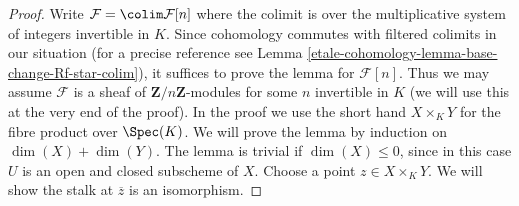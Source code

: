 \begin{proof}
Write $\mathcal{F} = \colim \mathcal{F}[n]$ where the colimit
is over the multiplicative system of integers invertible in $K$.
Since cohomology commutes with filtered colimits in our situation
(for a precise reference see Lemma \ref{etale-cohomology-lemma-base-change-Rf-star-colim}),
it suffices to prove the lemma for $\mathcal{F}[n]$. Thus we may
assume $\mathcal{F}$ is a sheaf of $\mathbf{Z}/n\mathbf{Z}$-modules
for some $n$ invertible in $K$ (we will use this at the very end of
the proof). In the proof we use the short hand $X \times_K Y$ for the fibre
product over $\Spec(K)$.
We will prove the lemma by induction on $\dim(X) + \dim(Y)$.
The lemma is trivial if $\dim(X) \leq 0$, since in this case
$U$ is an open and closed subscheme of $X$.
Choose a point $z \in X \times_K Y$. We will show
the stalk at $\overline{z}$ is an isomorphism.


\end{proof}
